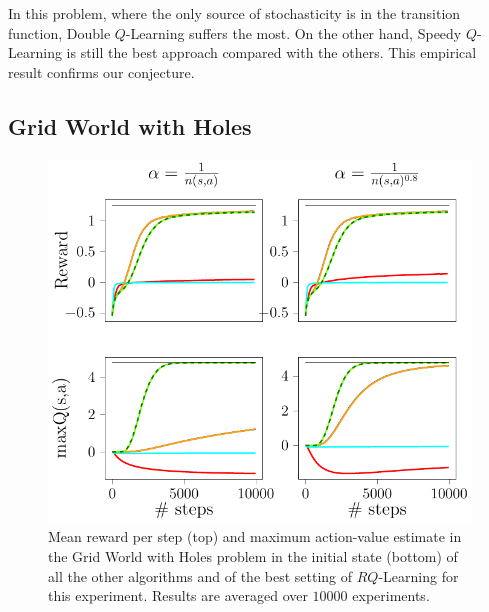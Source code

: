 In this problem, where the only source of stochasticity is in the transition function, Double $Q$-Learning suffers the most. On the other hand, Speedy $Q$-Learning is still the best approach compared with the others. This empirical result confirms our conjecture.
\subsection{Grid World with Holes}
\begin{figure}[t]
\begin{minipage}{\columnwidth}
\centering
  \includegraphics[scale=.7]{./img/grid_hole.pdf}
\end{minipage}
  \caption[Grid World with Holes algorithms comparison - 1]{Mean reward per step (top) and maximum action-value estimate in the Grid World with Holes problem in the initial state (bottom) of all the other algorithms and of the best setting of $RQ$-Learning for this experiment. Results are averaged over $10000$ experiments.}
  \label{F:hole}
\end{figure}

